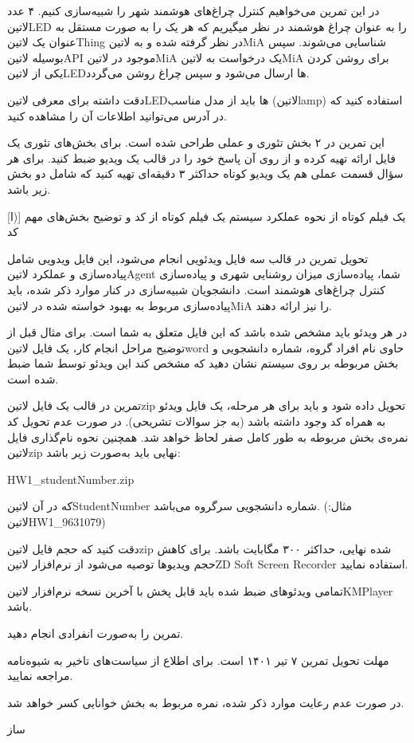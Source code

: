 \documentclass[]{assignment}
\begin{document}
در این تمرین می‌خواهیم کنترل چراغ‌های هوشمند شهر را شبیه‌سازی کنیم. ۴ عدد ‌لاتین{LED} را به عنوان چراغ هوشمند در نظر میگیریم
که هر یک را به صورت مستقل به عنوان یک ‌لاتین{Thing} در نظر گرفته شده و به ‌لاتین{MiA} شناسایی می‌شوند.
سپس بوسیله ‌لاتین{API} موجود در ‌لاتین{MiA} یک درخواست به ‌لاتین{MiA} برای روشن کردن یکی از ‌لاتین{LED}ها ارسال می‌شود
و سپس چراغ روشن می‌گردد.

دقت داشته برای معرفی ‌لاتین{LED}ها باید از مدل مناسب (‌لاتین{lamp}) استفاده کنید
که در  آدرس می‌توانید اطلاعات آن را مشاهده کنید.



 این تمرین در ۲ بخش تئوری و عملی طراحی شده است.
برای بخش‌های تئوری یک فایل ارائه تهیه کرده و از روی آن پاسخ خود را در قالب یک ویدیو ضبط کنید.
برای هر سؤال قسمت عملی هم یک ویدیو کوتاه حداکثر ۳ دقیقه‌ای تهیه کنید که شامل دو بخش زیر باشد.

[ا)]
 یک فیلم کوتاه از نحوه عملکرد سیستم
 یک فیلم کوتاه از کد و توضیح بخش‌های مهم کد

 تحویل تمرین در قالب سه فایل ویدئویی انجام می‌شود، این فایل ویدویی شامل پیاده‌سازی و عملکرد ‌لاتین{Agent} شما، پیاده‌سازی میزان روشنایی شهری
و پیاده‌سازی کنترل چراغ‌های هوشمند است.
دانشجویان شبیه‌سازی در کنار موارد ذکر شده، باید پیاده‌سازی مربوط به بهبود خواسته شده در ‌لاتین{MiA} را نیز ارائه دهند.

 در هر ویدئو باید مشخص شده باشد که این فایل متعلق به شما است. برای مثال قبل از توضیح مراحل انجام کار، یک فایل ‌لاتین{word}
حاوی نام افراد گروه، شماره دانشجویی و بخش مربوطه بر روی سیستم نشان دهید که مشخص کند این ویدئو توسط شما ضبط شده است.

 تمرین در قالب یک فایل ‌لاتین{zip} تحویل داده شود و باید برای هر مرحله، یک فایل ویدئو به همراه کد وجود داشته باشد (به جز سوالات تشریحی).
در صورت عدم تحویل کد نمره‌ی بخش مربوطه به طور کامل صفر لحاظ خواهد شد. همچنین نحوه نام‌گذاری فایل ‌لاتین{zip} نهایی باید به‌صورت زیر باشد:

HW1\_studentNumber.zip

که در آن ‌لاتین{StudentNumber} شماره دانشجویی سرگروه می‌باشد. (مثال: ‌لاتین{HW1\_9631079})

 دقت کنید که حجم فایل ‌لاتین{zip} شده نهایی، حداکثر ۳۰۰ مگابایت باشد.
برای کاهش حجم ویدیو‌ها توصیه می‌شود از نرم‌افزار ‌لاتین{ZD Soft Screen Recorder} استفاده نمایید.

 تمامی ویدئوهای ضبط شده باید قابل پخش با آخرین نسخه نرم‌افزار ‌لاتین{KMPlayer} باشد.

 تمرین را به‌صورت انفرادی انجام دهید.

 مهلت تحویل تمرین ۷ تیر ۱۴۰۱ است. برای اطلاع از سیاست‌های تاخیر به شیوه‌نامه مراجعه نمایید.

 در صورت عدم رعایت موارد ذکر شده، نمره مربوط به بخش خوانایی کسر خواهد شد.


‌ساز
\end{document}
